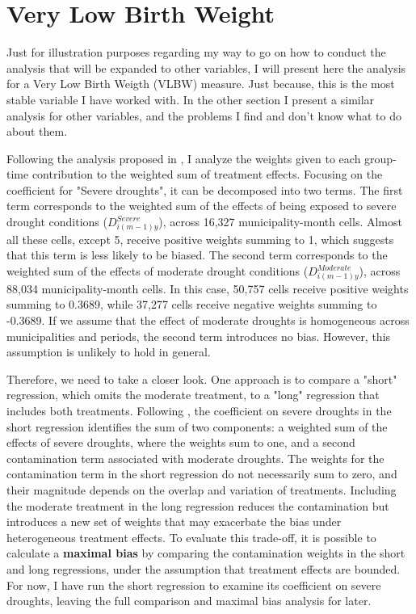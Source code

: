 \documentclass[12pt, oneside]{article}      %
\begin{document}
\section{Very Low Birth Weight}

Just for illustration purposes regarding my way to go on how to conduct the analysis that will be expanded to other variables, I will present here the analysis for a Very Low Birth Weigth (VLBW) measure. Just because, this is the most stable variable I have worked with. In the other section I present a similar analysis for other variables, and the problems I find and don't know what to do about them.







Following the analysis proposed in \cite{deChaisemartin2023}, I analyze the weights given to each group-time contribution to the weighted sum of treatment effects. Focusing on the coefficient for "Severe droughts", it can be decomposed into two terms. The first term corresponds to the weighted sum of the effects of being exposed to severe drought conditions ($D^{Severe}_{i(m-1)y}$), across 16,327 municipality-month cells. Almost all these cells, except 5, receive positive weights summing to 1, which suggests that this term is less likely to be biased. The second term corresponds to the weighted sum of the effects of moderate drought conditions ($D^{Moderate}_{i(m-1)y}$), across 88,034 municipality-month cells. In this case, 50,757 cells receive positive weights summing to 0.3689, while 37,277 cells receive negative weights summing to -0.3689. If we assume that the effect of moderate droughts is homogeneous across municipalities and periods, the second term introduces no bias. However, this assumption is unlikely to hold in general. 

Therefore, we need to take a closer look. One approach is to compare a "short" regression, which omits the moderate treatment, to a "long" regression that includes both treatments. Following \cite{deChaisemartin2023}, the coefficient on severe droughts in the short regression identifies the sum of two components: a weighted sum of the effects of severe droughts, where the weights sum to one, and a second contamination term associated with moderate droughts. The weights for the contamination term in the short regression do not necessarily sum to zero, and their magnitude depends on the overlap and variation of treatments. Including the moderate treatment in the long regression reduces the contamination but introduces a new set of weights that may exacerbate the bias under heterogeneous treatment effects. To evaluate this trade-off, it is possible to calculate a \textbf{maximal bias} by comparing the contamination weights in the short and long regressions, under the assumption that treatment effects are bounded. For now, I have run the short regression to examine its coefficient on severe droughts, leaving the full comparison and maximal bias analysis for later.
\end{document}
